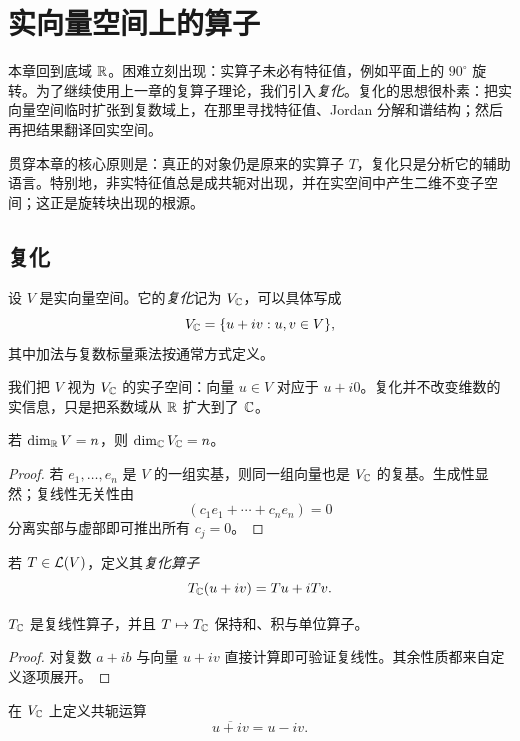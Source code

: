 \chapter{实向量空间上的算子}

本章回到底域 $\mathbb{R}$。困难立刻出现：实算子未必有特征值，例如平面上的 $90^\circ$ 旋转。为了继续使用上一章的复算子理论，我们引入\emph{复化}。复化的思想很朴素：把实向量空间临时扩张到复数域上，在那里寻找特征值、Jordan 分解和谱结构；然后再把结果翻译回实空间。

贯穿本章的核心原则是：真正的对象仍是原来的实算子 $T$，复化只是分析它的辅助语言。特别地，非实特征值总是成共轭对出现，并在实空间中产生二维不变子空间；这正是旋转块出现的根源。

\section{复化}

\begin{definition}
设 $V$ 是实向量空间。它的\emph{复化}记为 $V_{\mathbb{C}}$，可以具体写成
\[
V_{\mathbb{C}}=\{u+iv:u,v\in V\},
\]
其中加法与复数标量乘法按通常方式定义。
\end{definition}

我们把 $V$ 视为 $V_{\mathbb{C}}$ 的实子空间：向量 $u\in V$ 对应于 $u+i0$。复化并不改变维数的实信息，只是把系数域从 $\mathbb{R}$ 扩大到了 $\mathbb{C}$。

\begin{proposition}
若 $\dim_{\mathbb{R}} V=n$，则 $\dim_{\mathbb{C}} V_{\mathbb{C}}=n$。
\end{proposition}

\begin{proof}
若 $e_1,\dots,e_n$ 是 $V$ 的一组实基，则同一组向量也是 $V_{\mathbb{C}}$ 的复基。生成性显然；复线性无关性由
\[
(c_1e_1+\cdots+c_ne_n)=0
\]
分离实部与虚部即可推出所有 $c_j=0$。
\end{proof}

\begin{definition}
若 $T\in\mathcal{L}(V)$，定义其\emph{复化算子}
\[
T_{\mathbb{C}}(u+iv)=Tu+iTv.
\]
\end{definition}

\begin{proposition}
$T_{\mathbb{C}}$ 是复线性算子，并且 $T\mapsto T_{\mathbb{C}}$ 保持和、积与单位算子。
\end{proposition}

\begin{proof}
对复数 $a+ib$ 与向量 $u+iv$ 直接计算即可验证复线性。其余性质都来自定义逐项展开。
\end{proof}

\begin{definition}
在 $V_{\mathbb{C}}$ 上定义共轭运算
\[
\overline{u+iv}=u-iv.
\]
\end{definition}

